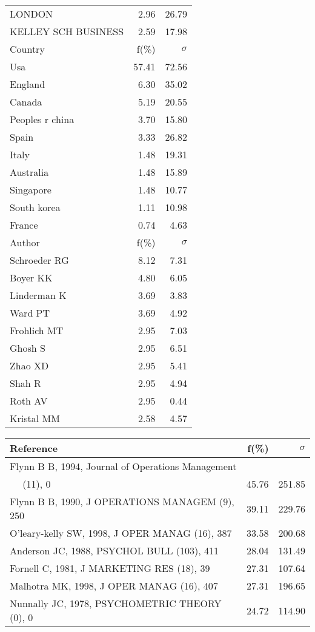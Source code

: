 \documentclass[a4paper,11pt]{report}
\begin{document}
\begin{landscape}
\begin{table}[!ht]
{\begin{tabular}{|l r r|}
LONDON & 2.96 & 26.79\\
KELLEY SCH BUSINESS & 2.59 & 17.98\\
\hline
\hline
Country & f(\%) & $\sigma$\\
\hline
Usa & 57.41 & 72.56\\
England & 6.30 & 35.02\\
Canada & 5.19 & 20.55\\
Peoples r china & 3.70 & 15.80\\
Spain & 3.33 & 26.82\\
Italy & 1.48 & 19.31\\
Australia & 1.48 & 15.89\\
Singapore & 1.48 & 10.77\\
South korea & 1.11 & 10.98\\
France & 0.74 & 4.63\\
\hline
\hline
Author & f(\%) & $\sigma$\\
\hline
Schroeder RG & 8.12 & 7.31\\
Boyer KK & 4.80 & 6.05\\
Linderman K & 3.69 & 3.83\\
Ward PT & 3.69 & 4.92\\
Frohlich MT & 2.95 & 7.03\\
Ghosh S & 2.95 & 6.51\\
Zhao XD & 2.95 & 5.41\\
Shah R & 2.95 & 4.94\\
Roth AV & 2.95 & 0.44\\
Kristal MM & 2.58 & 4.57\\
\hline
\end{tabular}
}
{\scriptsize\begin{tabular}{|l r r|}
\hline
Reference & f(\%) & $\sigma$\\
\hline
Flynn B B, 1994, Journal of Operations Management &  & \\
$\quad$ (11), 0 & 45.76 & 251.85\\
Flynn B B, 1990, J OPERATIONS MANAGEM (9), 250 & 39.11 & 229.76\\
O'leary-kelly SW, 1998, J OPER MANAG (16), 387 & 33.58 & 200.68\\
Anderson JC, 1988, PSYCHOL BULL (103), 411 & 28.04 & 131.49\\
Fornell C, 1981, J MARKETING RES (18), 39 & 27.31 & 107.64\\
Malhotra MK, 1998, J OPER MANAG (16), 407 & 27.31 & 196.65\\
Nunnally JC, 1978, PSYCHOMETRIC THEORY (0), 0 & 24.72 & 114.90\\

\end{tabular}}
\end{table}
\end{landscape}
\end{document}
